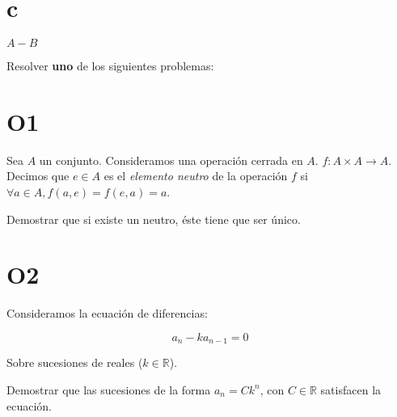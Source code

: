 \part{c} $A - B$

\hfill
\eject


Resolver {\bf uno} de los siguientes problemas:


\part{O1}

Sea $A$ un conjunto. Consideramos una operaci\'on cerrada en $A$.
$f : A \times A \rightarrow A$.
Decimos que $e \in A$ es el {\it elemento neutro} de la operaci\'on $f$ si
$\forall a \in A, f(a,e) = f(e,a) = a$.

Demostrar que si existe un neutro, \'este tiene que ser \'unico.


\part{O2}
Consideramos la ecuaci\'on de diferencias:

$$ a_n - k a_{n-1} = 0$$

Sobre sucesiones de reales ($k \in \mathbb{R}$).

Demostrar que las sucesiones de la forma $a_n = C k^n$, con $C \in \mathbb{R}$
satisfacen la ecuaci\'on.

\hfill

\bye


